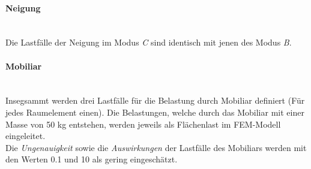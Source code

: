 \paragraph{Neigung}\mbox{}\\
Die Lastfälle der Neigung im Modus \emph{C} sind identisch mit jenen des Modus \emph{B}.

\paragraph{Mobiliar}\mbox{}\\
Insegsammt werden drei Lastfälle für die Belastung durch Mobiliar definiert (Für jedes Raumelement einen). Die Belastungen, welche durch das Mobiliar mit einer Masse von 50 kg entstehen, werden jeweils als Flächenlast im FEM-Modell eingeleitet.\\
Die \emph{Ungenauigkeit} sowie die \emph{Auswirkungen} der Lastfälle des Mobiliars werden mit den Werten 0.1 und 10 als gering eingeschätzt.


